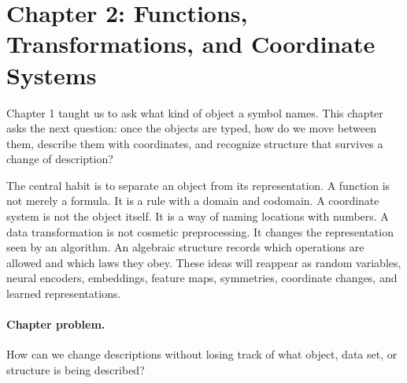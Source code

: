 \section{Chapter 2: Functions, Transformations, and Coordinate Systems}
\label{ch:functions-transformations-coordinate-systems}

Chapter 1 taught us to ask what kind of object a symbol names. This chapter asks the next question: once the objects are typed, how do we move between them, describe them with coordinates, and recognize structure that survives a change of description?

The central habit is to separate an object from its representation. A function is not merely a formula. It is a rule with a domain and codomain. A coordinate system is not the object itself. It is a way of naming locations with numbers. A data transformation is not cosmetic preprocessing. It changes the representation seen by an algorithm. An algebraic structure records which operations are allowed and which laws they obey. These ideas will reappear as random variables, neural encoders, embeddings, feature maps, symmetries, coordinate changes, and learned representations.

\paragraph{Chapter problem.}
How can we change descriptions without losing track of what object, data set, or structure is being described?

